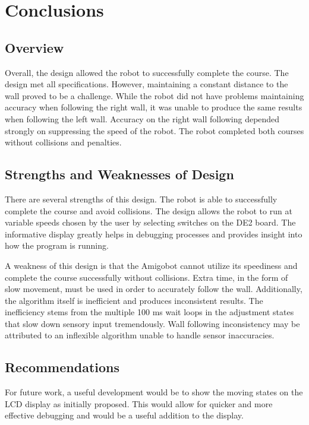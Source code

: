 \section{Conclusions}

\subsection{Overview}

Overall, the design allowed the robot to successfully complete the
course. The design met all specifications. However, maintaining a
constant distance to the wall proved to be a challenge. While the
robot did not have problems maintaining accuracy when following the
right wall, it was unable to produce the same results when following the
left wall. Accuracy on the right wall following depended strongly on
suppressing the speed of the robot. The robot completed both courses
without collisions and penalties. 

\subsection{Strengths and Weaknesses of Design}

There are several strengths of this design. The robot is able to
successfully complete the course and avoid collisions. The design
allows the robot to run at variable speeds chosen by the user by
selecting switches on the DE2 board. The informative display greatly
helps in debugging processes and provides insight into how the program
is running. 

A weakness of this design is that the Amigobot cannot utilize its
speediness and complete the course successfully without
collisions. Extra time, in the form of slow movement, must be used in
order to accurately follow the wall. Additionally, the algorithm
itself is inefficient and produces inconsistent results. The
inefficiency stems from the multiple 100  ms wait loops in the adjustment states that
slow down sensory input tremendously. Wall following inconsistency may be attributed to
an inflexible algorithm unable to handle sensor inaccuracies.

\subsection{Recommendations}

For future work, a useful development would be to show the moving
states on the LCD display as initially proposed. This would allow for quicker and more
effective debugging and would be a useful addition to the display. 

